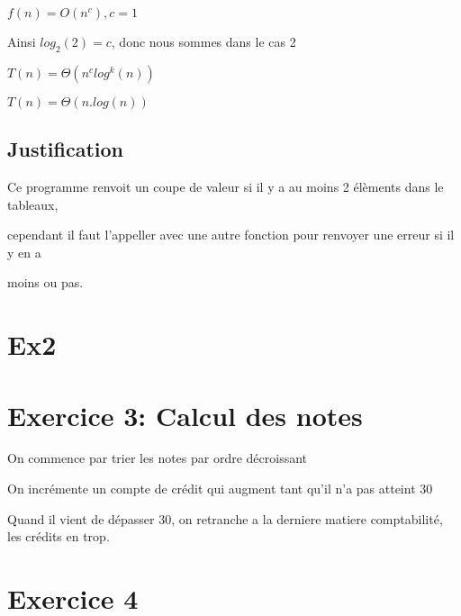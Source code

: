 \documentclass[a4paper]{article}
\begin{document}
$f(n) = O(n^c), c = 1$

Ainsi $log_2(2) = c$, donc nous sommes dans le cas 2

$T(n) = \Theta(n^c log^k(n))$

$T(n) = \Theta(n.log(n))$
\subsection{Justification}

Ce programme renvoit  un coupe de valeur si il y a au moins 2 élèments dans le tableaux, 

cependant il faut l'appeller avec une autre fonction pour renvoyer une erreur si il y en a 

moins ou pas.
\section{Ex2}
\section{Exercice 3: Calcul des notes}
On commence par trier les notes par ordre décroissant

On incrémente un compte de crédit qui augment tant qu'il n'a pas atteint 30

Quand il vient de dépasser 30, on retranche a la derniere matiere comptabilité, les crédits en trop.
\section{Exercice 4}
\end{document}
